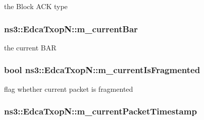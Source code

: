 the Block A\+CK type 

\subsubsection[{\texorpdfstring{m\+\_\+current\+Bar}{m_currentBar}}]{ ns3\+::\+Edca\+Txop\+N\+::m\+\_\+current\+Bar\hspace{0.3cm}{\ttfamily [private]}}\hypertarget{classns3_1_1EdcaTxopN_a8500ea69876682da40eab4222b7066c5}{}\label{classns3_1_1EdcaTxopN_a8500ea69876682da40eab4222b7066c5}


the current B\+AR 

\subsubsection[{\texorpdfstring{m\+\_\+current\+Is\+Fragmented}{m_currentIsFragmented}}]{\setlength{\rightskip}{0pt plus 5cm}bool ns3\+::\+Edca\+Txop\+N\+::m\+\_\+current\+Is\+Fragmented\hspace{0.3cm}{\ttfamily [private]}}\hypertarget{classns3_1_1EdcaTxopN_af17d826141cb2e87903a268e5f9f57ad}{}\label{classns3_1_1EdcaTxopN_af17d826141cb2e87903a268e5f9f57ad}


flag whether current packet is fragmented 

\subsubsection[{\texorpdfstring{m\+\_\+current\+Packet\+Timestamp}{m_currentPacketTimestamp}}]{ ns3\+::\+Edca\+Txop\+N\+::m\+\_\+current\+Packet\+Timestamp\hspace{0.3cm}{\ttfamily [private]}}\hypertarget{classns3_1_1EdcaTxopN_ad93008b9d802a1c1b007744f0d4f1a73}{}\label{classns3_1_1EdcaTxopN_ad93008b9d802a1c1b007744f0d4f1a73}


